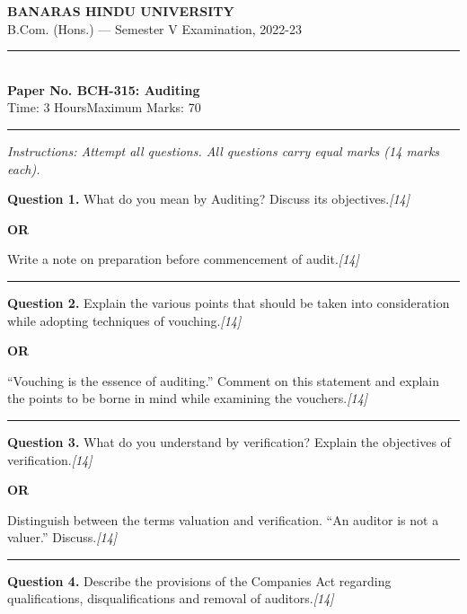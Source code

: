 \documentclass[11pt,a4paper]{article}
\newcommand{\pts}[1]{\hfill   \textit{[#1]}}
\begin{document}
\begin{center}
  {\large\bfseries BANARAS HINDU UNIVERSITY}\\[2pt]
  {\normalsize B.Com. (Hons.) --- Semester V Examination, 2022-23}\\[6pt]
  \rule{0.8\linewidth}{0.5pt}\\[6pt]
  {\large\bfseries Paper No. BCH-315: Auditing}\\[4pt]
  {\normalsize Time: 3 Hours\hfill Maximum Marks: 70}
\end{center}

\rule{\linewidth}{0.4pt}

\smallskip



\noindent   \textit{Instructions: Attempt all questions. All questions carry equal marks (14 marks each).}

\bigskip




\noindent   \textbf{Question 1.}
What do you mean by Auditing? Discuss its objectives.\pts{14}

\centerline{   \textbf{OR}}

Write a note on preparation before commencement of audit.\pts{14}

\medskip\rule{\linewidth}{0.2pt}




\noindent   \textbf{Question 2.}
Explain the various points that should be taken into consideration while adopting techniques of vouching.\pts{14}

\centerline{   \textbf{OR}}

``Vouching is the essence of auditing.'' Comment on this statement and explain the points to be borne in mind while examining the vouchers.\pts{14}

\medskip\rule{\linewidth}{0.2pt}




\noindent   \textbf{Question 3.}
What do you understand by verification? Explain the objectives of verification.\pts{14}

\centerline{   \textbf{OR}}

Distinguish between the terms valuation and verification. ``An auditor is not a valuer.'' Discuss.\pts{14}

\medskip\rule{\linewidth}{0.2pt}




\noindent   \textbf{Question 4.}
Describe the provisions of the Companies Act regarding qualifications, disqualifications and removal of auditors.\pts{14}
\end{document}
